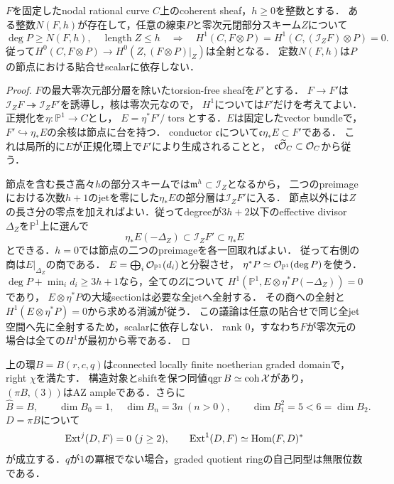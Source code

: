 \documentclass[11pt,a4paper]{ltjsarticle}
\begin{document}
\begin{lemma}[節点曲線上の一様なsection消滅と評価]
$F$を固定したnodal rational curve $C$上のcoherent sheaf，$h\geq0$を整数とする．
ある整数$N(F,h)$が存在して，任意の線束$P$と零次元閉部分スキーム$Z$について
\[
 \deg P\geq N(F,h),\quad\operatorname{length}Z\leq h
 \quad\Longrightarrow\quad
 H^1(C,F\otimes P)=H^1(C,(\mathcal I_ZF)\otimes P)=0.
\]
従って$H^0(C,F\otimes P)\to H^0(Z,(F\otimes P)|_Z)$は全射となる．
定数$N(F,h)$は$P$の節点における貼合せscalarに依存しない．
\end{lemma}
\begin{proof}
$F$の最大零次元部分層を除いたtorsion-free sheafを$F'$とする．
$F\to F'$は$\mathcal I_ZF\twoheadrightarrow\mathcal I_ZF'$を誘導し，核は零次元なので，
$H^1$については$F'$だけを考えてよい．正規化を$\eta:\mathbb P^1\to C$とし，
$E=\eta^*F'/\operatorname{tors}$とする．$E$は固定したvector bundleで，
$F'\hookrightarrow\eta_*E$の余核は節点に台を持つ．
conductor $\mathfrak c$について$\mathfrak c\eta_*E\subset F'$である．
これは局所的に$E$が正規化環上で$F'$により生成されることと，
$\mathfrak c\widetilde{\mathcal O}_C\subset\mathcal O_C$から従う．

節点を含む長さ高々$h$の部分スキームでは$\mathfrak m^h\subset\mathcal I_Z$となるから，
二つのpreimageにおける次数$h+1$のjetを零にした$\eta_*E$の部分層は$\mathcal I_ZF'$に入る．
節点以外には$Z$の長さ分の零点を加えればよい．従ってdegreeが$3h+2$以下のeffective divisor
$\Delta_Z$を$\mathbb P^1$上に選んで
\[
 \eta_*E(-\Delta_Z)\subset\mathcal I_ZF'\subset\eta_*E
\]
とできる．$h=0$では節点の二つのpreimageを各一回取ればよい．
従って右側の商は$E|_{\Delta_Z}$の商である．
$E=\bigoplus_i\mathcal O_{\mathbb P^1}(d_i)$と分裂させ，
$\eta^*P\simeq\mathcal O_{\mathbb P^1}(\deg P)$を使う．
$\deg P+\min_i d_i\geq3h+1$なら，全ての$Z$について
$H^1(\mathbb P^1,E\otimes\eta^*P(-\Delta_Z))=0$であり，
$E\otimes\eta^*P$の大域sectionは必要な全jetへ全射する．
その商への全射と$H^1(E\otimes\eta^*P)=0$から求める消滅が従う．
この議論は任意の貼合せで同じ全jet空間へ先に全射するため，scalarに依存しない．
rank $0$，すなわち$F$が零次元の場合は全ての$H^1$が最初から零である．
\end{proof}

\begin{proposition}[明示的な飽和境界族]
上の環$B=B(r,c,q)$はconnected locally finite noetherian graded domainで，right $\chi$を満たす．
構造対象とshiftを保つ同値$\operatorname{qgr} B\simeq\operatorname{coh}\mathcal X$があり，
$(\pi B,(3))$はAZ ampleである．さらに
\[
 \widehat B=B,\qquad \dim B_0=1,\quad \dim B_n=3n\ (n>0),\qquad
 \dim B_1^2=5<6=\dim B_2.
\]
$D=\pi B$について
\[
 \operatorname{Ext}^j(D,F)=0\ (j\geq2),\qquad
\operatorname{Ext}^1(D,F)\simeq\operatorname{Hom}(F,D)^*
\]
が成立する．$q$が$1$の冪根でない場合，graded quotient ringの自己同型は無限位数である．
\end{proposition}
\end{document}
